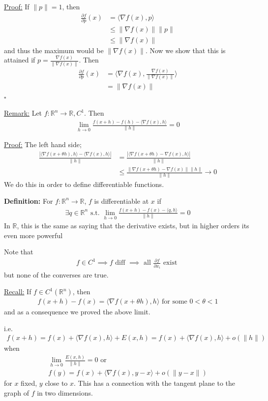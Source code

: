 \documentclass{article}
\newcommand*{\qed}{\hfill$\square$}%
\newcommand*{\txt}[1]{\text{ #1 }}%
\newcommand*{\iprod}[1]{\langle #1 \rangle}
\newcommand*{\rr}{\mathbb{R}}%
\begin{document}
\underline{Proof:} If $\|p\|=1$, then \begin{align*}
    \frac{\partial f}{\partial p}(x)&=\iprod{\nabla f(x),p}\\
    &\leq \|\nabla f(x)\|\|p\|\\
    &\leq\|\nabla f(x)\|
\end{align*} and thus the maximum would be $\|\nabla f(x)\|$. Now we show that this is attained if $p=\frac{\nabla f(x)}{\|\nabla f(x)\|}$. Then \begin{align*}
    \frac{\partial f}{\partial p}(x)&=\iprod{\nabla f(x),\frac{\nabla f(x)}{\|\nabla f(x)\|}}\\
    &=\|\nabla f(x)\|
\end{align*} \qed

\underline{Remark:} Let $f:\rr^n\to\rr, C^1$. Then \begin{align*}
    \lim_{h\to 0}\frac{f(x+h)-f(h)-\iprod{\nabla f(x),h}}{\|h\|}=0
\end{align*}

\underline{Proof:} The left hand side; \begin{align*}
    \frac{|\iprod{\nabla f(x+\theta h),h}-\iprod{\nabla f(x),h}|}{\|h\|}&=\frac{|\iprod{\nabla f(x+\theta h)-\nabla f(x),h}|}{\|h\|}\\
    &\leq \frac{\|\nabla f(x+\theta h)-\nabla f(x)\|\|h\|}{\|h\|}\to 0
\end{align*} We do this in order to define differentiable functions. 

\textbf{Definition:} For $f:\rr^n\to \rr$, $f$ is differentiable at $x$ if \begin{align*}
    \exists q\in \rr^n\txt{s.t.}\lim_{h\to 0}\frac{f(x+h)-f(x)-\iprod{q,h}}{\|h\|}=0
\end{align*} In $\rr$, this is the same as saying that the derivative exists, but in higher orders its even more powerful

Note that \begin{align*}
    f\in C^1\implies f\txt{diff}\implies \txt{all}\frac{\partial f}{\partial x_i}\txt{exist}
\end{align*} but none of the converses are true.

\underline{Recall:} If $f\in C^1(\rr^n)$, then \begin{align*}
    f(x+h)-f(x)=\iprod{\nabla f(x+\theta h),h}\txt{for some}0<\theta<1
\end{align*} and as a consequence we proved the above limit.

i.e. \begin{align*}
    f(x+h)=f(x)+\iprod{\nabla f(x),h}+E(x,h)=f(x)+\iprod{\nabla f(x),h}+o(\|h\|)
\end{align*} when \begin{align*}
    \lim_{h\to 0}\frac{E(x,h)}{\|h\|}=0\txt{or}\\
    f(y)=f(x)+\iprod{\nabla f(x),y-x}+o(\|y-x\|)
\end{align*} for $x$ fixed, $y$ close to $x$. This has a connection with the tangent plane to the graph of $f$ in two dimensions. 
\end{document}
